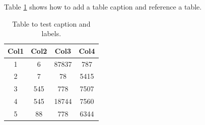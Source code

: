 \documentclass{article}
\begin{document}
Table \ref{table:date} shows how to add a table caption and reference a table.
\begin{table}[h!]
\centering
\begin{tabular}{||c  c c c||}
    \hline
    Col1 & Col2 & Col3  & Col4 \\ [0.5ex]
    \hline
    \hline
    1 & 6 & 87837  & 787 \\
    2 & 7 & 78 & 5415 \\
    3 & 545 & 778 & 7507 \\
    4 & 545 & 18744 & 7560 \\
    5 & 88 & 778 & 6344 \\ [1ex]
    \hline
\end{tabular}
\caption{Table to test caption and labels.}
\label{table:date}
\end{table}
\end{document}
